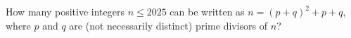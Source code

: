 How many positive integers $n\le 2025$ can be written as $n = (p+q)^2 +p+q$, where $p$ and $q$ are (not necessarily distinct) prime divisors of $n$?
